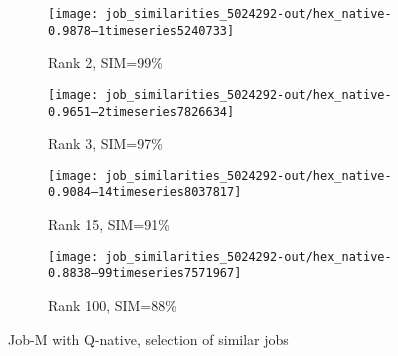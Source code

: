 \documentclass{jhps}
\begin{document}
\begin{figure}[bt]
\begin{subfigure}{0.47\textwidth}
\centering
\texttt{[image: job\_similarities\_5024292-out/hex\_native-0.9878--1timeseries5240733]}
\caption{Rank 2, SIM=99\%}
\end{subfigure}
\begin{subfigure}{0.47\textwidth}
\centering
\texttt{[image: job\_similarities\_5024292-out/hex\_native-0.9651--2timeseries7826634]}
\caption{Rank 3, SIM=97\%}
\end{subfigure}
\begin{subfigure}{0.47\textwidth}
\texttt{[image: job\_similarities\_5024292-out/hex\_native-0.9084--14timeseries8037817]}
\caption{Rank 15, SIM=91\%}
\end{subfigure}
\begin{subfigure}{0.47\textwidth}
\centering
\texttt{[image: job\_similarities\_5024292-out/hex\_native-0.8838--99timeseries7571967]}
\caption{Rank 100, SIM=88\%}
\end{subfigure}

\caption{Job-M with Q-native, selection of similar jobs}%
\label{fig:job-M-hex-native}
\end{figure}

%
%
\end{document}
